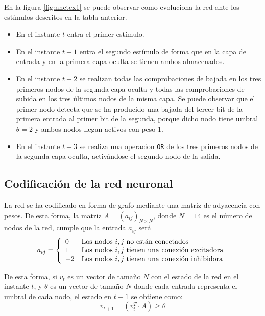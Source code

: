 \documentclass[spanish]{assignment}
\begin{document}
	En la figura \ref{fig:nnetex1} se puede observar como evoluciona la red ante los estímulos descritos en la tabla anterior.
	
	
	\begin{itemize}
	\item En el instante $t$ entra el primer estímulo.
	\item En el instante $t+1$ entra el segundo estímulo de forma que en la capa de entrada y en la primera capa oculta se tienen ambos almacenados.
	\item En el instante $t+2$ se realizan todas las comprobaciones de bajada en los tres primeros nodos de la segunda capa oculta y todas las comprobaciones de subida en los tres últimos nodos de la misma capa. Se puede observar que el primer nodo detecta que se ha producido una bajada del tercer bit de la primera entrada al primer bit de la segunda, porque dicho nodo tiene umbral $\theta=2$ y ambos nodos llegan activos con peso $1$.
	
	\item En el instante $t+3$ se realiza una operacion \texttt{OR} de los tres primeros nodos de la segunda capa oculta, activándose el segundo nodo de la salida.
	\end{itemize} 
	
	\subsection{Codificación de la red neuronal}
	La red se ha codificado en forma de grafo mediante una matriz de adyacencia con pesos. De esta forma, la matriz $A = (a_{ij})_{N\times N}$, donde $N=14$ es el número de nodos de la red, cumple que la entrada $a_{ij}$ será
	\begin{equation*}
		a_{ij} = 
		\left\{
		\begin{array}{l l}
		0 & \text{Los nodos } i,j \text{ no están conectados}\\
		1 & \text{Los nodos } i,j \text{ tienen una conexión excitadora}\\
		-2 & \text{Los nodos } i,j \text{ tienen una conexión inhibidora}
		\end{array}
		\right.
	\end{equation*}
	
	De esta forma, si $v_t$ es un vector de tamaño $N$ con el estado de la red en el instante $t$, y $\theta$ es un vector de tamaño $N$ donde cada entrada representa el umbral de cada nodo, el estado en $t+1$ se obtiene como:
	$$v_{t+1} = \left(v_t^T\cdot A\right) \ge \theta$$
	
\end{document}

